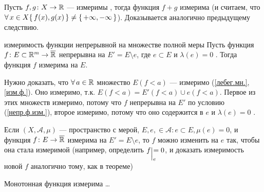 \begin{slv}[https://www.youtube.com/live/3LvgYceATKY?si=7WMGceaqVhikXnEY&t=8177]
	Пусть $f, g \colon X \to \mathbb R$ --- измеримы , тогда функция $f + g$ измерима (и считаем, что $\forall \, x \in X \{\,f(x), g(x)\,\} \ne \{\,+\infty, -\infty\,\}$). Доказывается аналогично предыдущему следствию.
\end{slv}
\pagebreak
\begin{teor}[https://www.youtube.com/live/3LvgYceATKY?si=ZYlgdvhg-6AVMtL_&t=8408]{измеримость функции непрерывной на множестве полной меры}
	Пусть функция $f \colon E \subset \mathbb R^m \to \overline{\mathbb R}$ непрерывна на $E' = E \setminus e$, где $e \subset E$ и $\lambda(e) = 0$ . Тогда функция $f$ измерима на $E$.
\end{teor}

\begin{prf}
	Нужно доказать, что $\forall \, a \in \mathbb R$ множество $E(f < a)$ --- измеримо (\ref{лебег.мн.}, \ref{изм.ф.}). Оно измеримо, т.к. $E(f < a) = E'(f < a) \cup e(f < a)$. Первое из этих множеств измеримо, потому что $f$ непрерывна на $E'$ по условию (\ref{непр.ф.изм.}), второе измеримо, потому что оно содержится в $e$ и $\lambda(e) = 0$ .
\end{prf}

\begin{slv}[https://www.youtube.com/live/3LvgYceATKY?si=gOwssnHN2eKqCbab&t=9162]\label{изм. на e}
	Если $(X, \mathcal A, \mu)$ --- пространство с мерой, $E, e, \in \mathcal A : e \subset E, \mu(e) = 0$, и функция $f \colon E \to \overline{\mathbb R}$ измерима на $E' = E \setminus e$, то $f$ можно изменить на $e$ так, чтобы она стала измеримой (например, определить $f \su{e} = 0$, и доказать измеримость новой $f$ аналогично тому, как в теореме)
\end{slv}

\begin{slv}
	Монотонная функция измерима \dots 
\end{slv}
